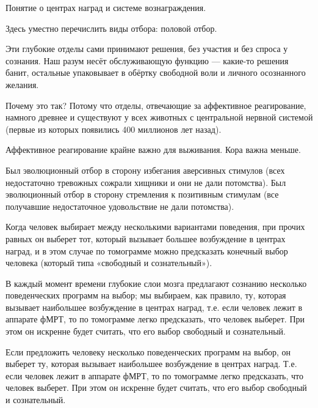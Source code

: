 \documentclass[11pt]{article}
\theoremstyle{remark}
\theoremstyle{definition}
\begin{document}
Понятие о центрах наград и системе вознаграждения.

Здесь уместно перечислить виды отбора: половой отбор. 


Эти глубокие отделы сами принимают решения, без участия и без спроса у сознания. Наш разум несёт обслуживающую функцию --- какие-то решения банит, остальные упаковывает в обёртку свободной воли и личного осознанного желания.

Почему это так? Потому что отделы, отвечающие за аффективное реагирование, намного древнее и существуют у всех животных с центральной нервной системой (первые из которых появились 400 миллионов лет назад). 

Аффективное реагирование крайне важно для выживания. Кора важна меньше.



Был эволюционный отбор в сторону избегания аверсивных стимулов (всех недостаточно тревожных сожрали хищники и они не дали потомства). Был эволюционный отбор в сторону стремления к позитивным стимулам (все получавшие недостаточное удовольствие не дали потомства). 




Когда человек выбирает между несколькими вариантами поведения, при прочих равных он выберет тот, который вызывает большее возбуждение в центрах наград, и в этом случае по томограмме можно предсказать конечный выбор человека (который типа «свободный и сознательный»).


В каждый момент времени глубокие слои мозга предлагают сознанию несколько поведенческих программ на выбор; мы выбираем, как правило, ту, которая вызывает наибольшее возбуждение в центрах наград, т.е. если человек лежит в аппарате фМРТ, то по томограмме легко предсказать, что человек выберет. При этом он искренне будет считать, что его выбор свободный и сознательный.

Если предложить человеку несколько поведенческих программ на выбор, он выберет ту, которая вызывает наибольшее возбуждение в центрах наград. Т.е. если человек лежит в аппарате фМРТ, то по томограмме легко предсказать, что человек выберет. При этом он искренне будет считать, что его выбор свободный и сознательный.
\end{document}
